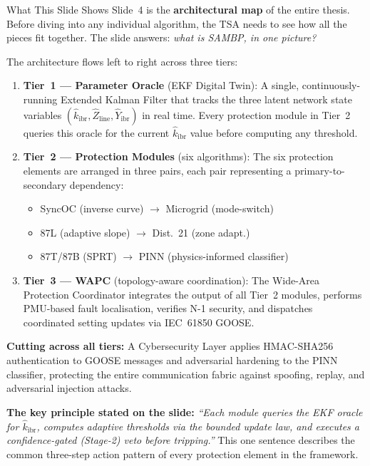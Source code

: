 \documentclass[12pt,a4paper]{article}
\newcommand{\kibrhat}{\hat{k}_\mathrm{ibr}}
\newcommand{\Zline}{\hat{Z}_\mathrm{line}}
\newcommand{\Yibr}{\hat{Y}_\mathrm{ibr}}
\begin{document}
\begin{keybox}{What This Slide Shows}
Slide~4 is the \textbf{architectural map} of the entire thesis.  Before diving
into any individual algorithm, the TSA needs to see how all the pieces fit
together.  The slide answers: \emph{what is SAMBP, in one picture?}

\medskip
The architecture flows left to right across three tiers:
\begin{enumerate}[nosep]
  \item \textbf{Tier~1 --- Parameter Oracle} (EKF Digital Twin): A single,
        continuously-running Extended Kalman Filter that tracks the three
        latent network state variables $(\kibrhat, \Zline, \Yibr)$ in
        real time.  Every protection module in Tier~2 queries this oracle
        for the current $\kibrhat$ value before computing any threshold.
  \item \textbf{Tier~2 --- Protection Modules} (six algorithms): The six
        protection elements are arranged in three pairs, each pair representing
        a primary-to-secondary dependency:
        \begin{itemize}[nosep]
          \item SyncOC (inverse curve) $\to$ Microgrid (mode-switch)
          \item 87L (adaptive slope) $\to$ Dist.~21 (zone adapt.)
          \item 87T/87B (SPRT) $\to$ PINN (physics-informed classifier)
        \end{itemize}
  \item \textbf{Tier~3 --- WAPC} (topology-aware coordination): The
        Wide-Area Protection Coordinator integrates the output of all Tier~2
        modules, performs PMU-based fault localisation, verifies N-1 security,
        and dispatches coordinated setting updates via IEC~61850 GOOSE.
\end{enumerate}

\textbf{Cutting across all tiers:} A Cybersecurity Layer applies
HMAC-SHA256 authentication to GOOSE messages and adversarial hardening to
the PINN classifier, protecting the entire communication fabric against
spoofing, replay, and adversarial injection attacks.

\medskip
\textbf{The key principle stated on the slide:}  \textit{``Each module
queries the EKF oracle for $\kibrhat$, computes adaptive thresholds via
the bounded update law, and executes a confidence-gated (Stage-2) veto
before tripping.''}  This one sentence describes the common three-step
action pattern of every protection element in the framework.
\end{keybox}
\end{document}
